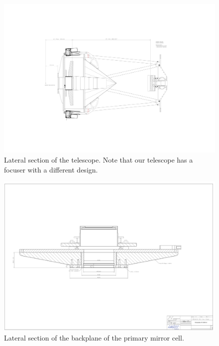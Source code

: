 \begin{figure}
\begin{center}
\includegraphics[height=0.9\linewidth,angle=90]{figures/telescope-lateral-section.pdf}
\end{center}
\caption{Lateral section of the telescope. Note that our telescope has a focuser with a different design.}
\label{figure:telescope-lateral-section}
\end{figure}

\begin{figure}
\begin{center}
\includegraphics[height=1.0\linewidth,angle=90]{figures/telescope-primary-mirror-cell-backplane-section}
\end{center}
\caption{Lateral section of the backplane of the primary mirror cell.}
\label{telescope-primary-mirror-cell-backplane-section}
\end{figure}

